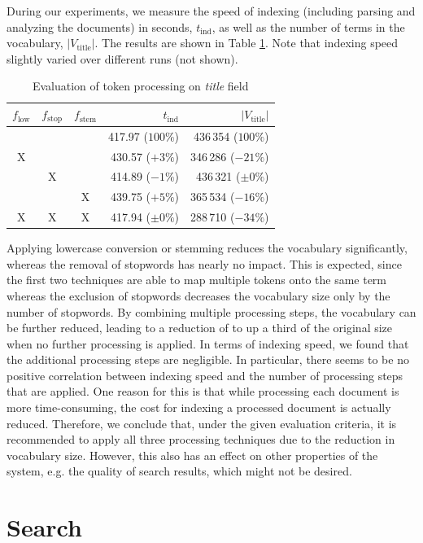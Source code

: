 \documentclass{sig-alternate-05-2015}
\begin{document}
During our experiments, we measure the speed of indexing (including parsing and analyzing the documents) in seconds, $t_\text{ind}$, as well as the number of terms in the vocabulary, $|V_\text{title}|$. The results are shown in Table \ref{tbl:evalindex}. Note that indexing speed slightly varied over different runs (not shown).

\begin{table}[th]
\centering
\caption{Evaluation of token processing on \emph{title} field} \label{tbl:evalindex}
\begin{tabular}{cccrr}
$f_\text{low}$ & $f_\text{stop}$ & $f_\text{stem}$ & $t_\text{ind}$ & $|V_\text{title}|$\\
\hline
& & & 417.97 ($100\%$) & 436\,354 ($100\%$) \\
X & & & 430.57 ($+3\%$) & 346\,286 ($-21\%$) \\
& X & & 414.89 ($-1\%$) & 436\,321 ($\pm0\%$) \\
& & X & 439.75 ($+5\%$) & 365\,534 ($-16\%$) \\
X & X & X & 417.94 ($\pm0\%$) & 288\,710 ($-34\%$) \\
\end{tabular}
\end{table}

Applying lowercase conversion or stemming reduces the vocabulary significantly, whereas the removal of stopwords has nearly no impact. This is expected, since the first two techniques are able to map multiple tokens onto the same term whereas the exclusion of stopwords decreases the vocabulary size only by the number of stopwords. By combining multiple processing steps, the vocabulary can be further reduced, leading to a reduction of to up a third of the original size when no further processing is applied. In terms of indexing speed, we found that the additional processing steps are negligible. In particular, there seems to be no positive correlation between indexing speed and the number of processing steps that are applied. One reason for this is that while processing each document is more time-consuming, the cost for indexing a processed document is actually reduced. Therefore, we conclude that, under the given evaluation criteria, it is recommended to apply all three processing techniques due to the reduction in vocabulary size. However, this also has an effect on other properties of the system, e.g. the quality of search results, which might not be desired.

\section{Search} \label{sec:search}
\end{document}
